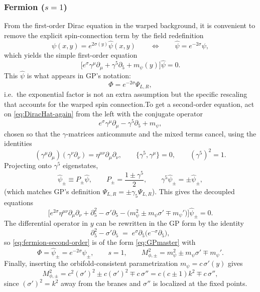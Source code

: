 \documentclass[11pt]{article}
\begin{document}
\subsubsection*{Fermion ($s=1$)}
From the first-order Dirac equation in the warped background, it is convenient to remove the explicit spin-connection term by the field redefinition
\[
\psi(x,y)=e^{2\sigma(y)}\hat\psi(x,y)
\qquad\Longleftrightarrow\qquad
\hat\psi=e^{-2\sigma}\psi,
\]
which yields the simple first-order equation
\begin{equation}
\Big[e^{\sigma}\gamma^\mu\partial_\mu+\gamma^5\partial_5+m_\psi(y)\Big]\hat\psi=0.
\label{eq:DiracHat-again}
\end{equation}
This $\hat\psi$ is what appears in GP’s notation:
\[
\Phi = e^{-2\sigma}\Psi_{L,R},
\]
i.e.\ the exponential factor is not an extra assumption but the specific rescaling that accounts for the warped spin connection.To get a second-order equation, act on \eqref{eq:DiracHat-again} from the left with the conjugate operator
\[
e^{\sigma}\gamma^\mu\partial_\mu-\gamma^5\partial_5+m_\psi,
\]
chosen so that the $\gamma$-matrices anticommute and the mixed terms cancel, using the identities
\[
(\gamma^\mu\partial_\mu)(\gamma^\nu\partial_\nu)=\eta^{\mu\nu}\partial_\mu\partial_\nu,
\qquad
\{\gamma^5,\gamma^\mu\}=0,
\qquad
(\gamma^5)^2=1.
\]
Projecting onto $\gamma^5$ eigenstates,
\[
\hat\psi_\pm \equiv P_\pm \hat\psi,
\qquad
P_\pm=\frac{1\pm\gamma^5}{2},
\qquad
\gamma^5\hat\psi_\pm=\pm \hat\psi_\pm,
\]
(which matches GP’s definition $\Psi_{L,R}=\pm\gamma_5\Psi_{L,R}$).
This gives the decoupled equations
\begin{equation}
\Big[
e^{2\sigma}\eta^{\mu\nu}\partial_\mu\partial_\nu
+ \partial_5^2 - \sigma'\partial_5
- \big(m_\psi^2 \pm m_\psi\sigma' \mp m_\psi'\big)
\Big]\hat\psi_\pm=0.
\label{eq:fermion-second-order}
\end{equation}
The differential operator in $y$ can be rewritten in the GP form by the identity
\[
\partial_5^2-\sigma'\partial_5 \;=\; e^{\sigma}\partial_5\!\big(e^{-\sigma}\partial_5\big),
\]
so \eqref{eq:fermion-second-order} is of the form \eqref{eq:GPmaster} with
\[
\Phi=\hat\psi_\pm=e^{-2\sigma}\psi_\pm,
\qquad s=1,
\qquad
M_{\phi,\pm}^2 = m_\psi^2 \pm m_\psi\sigma' \mp m_\psi'.
\]
Finally, inserting the orbifold-consistent parametrization $m_\psi=c\,\sigma'(y)$ gives
\[
M_{\phi,\pm}^2
= c^2(\sigma')^2 \pm c(\sigma')^2 \mp c\,\sigma''
= c(c\pm 1)k^2 \mp c\,\sigma'',
\]
since $(\sigma')^2=k^2$ away from the branes and $\sigma''$ is localized at the fixed points.
\end{document}
